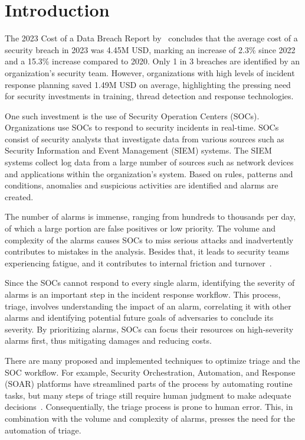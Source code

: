 \section{Introduction}
\label{sec:introduction}

The 2023 Cost of a Data Breach Report by\ \citet{ibm2023cost} concludes that the average cost of a security breach in
2023 was 4.45M USD, marking an increase of 2.3\% since 2022 and a 15.3\% increase compared to 2020.
Only 1 in 3 breaches are identified by an organization's security team.
However, organizations with high levels of incident response planning saved 1.49M USD on average, highlighting the
pressing need for security investments in training, thread detection and response technologies.

One such investment is the use of Security Operation Centers (SOCs).
Organizations use SOCs to respond to security incidents in real-time.
SOCs consist of security analysts that investigate data from various sources such as Security Information and Event
Management (SIEM) systems.
The SIEM systems collect log data from a large number of sources such as network devices and applications within the
organization's system.
Based on rules, patterns and conditions, anomalies and suspicious activities are identified and alarms are created.

The number of alarms is immense, ranging from hundreds to thousands per day, of which a large portion are false
positives or low priority.
The volume and complexity of the alarms causes SOCs to miss serious attacks and inadvertently contributes to mistakes in
the analysis.
Besides that, it leads to security teams experiencing fatigue, and it contributes to internal friction and
turnover\ \citep{orca2022fatigue}.

Since the SOCs cannot respond to every single alarm, identifying the severity of alarms is an important step in the
incident response workflow.
This process, triage, involves understanding the impact of an alarm, correlating it with other alarms and identifying
potential future goals of adversaries to conclude its severity.
By prioritizing alarms, SOCs can focus their resources on high-severity alarms first, thus mitigating damages and
reducing costs.

There are many proposed and implemented techniques to optimize triage and the SOC workflow.
For example, Security Orchestration, Automation, and Response (SOAR) platforms have streamlined parts of the process by
automating routine tasks, but many steps of triage still require human judgment to make adequate
decisions\ \citep{chuvakin2019triaging}.
Consequentially, the triage process is prone to human error.
This, in combination with the volume and complexity of alarms, presses the need for the automation of triage.

